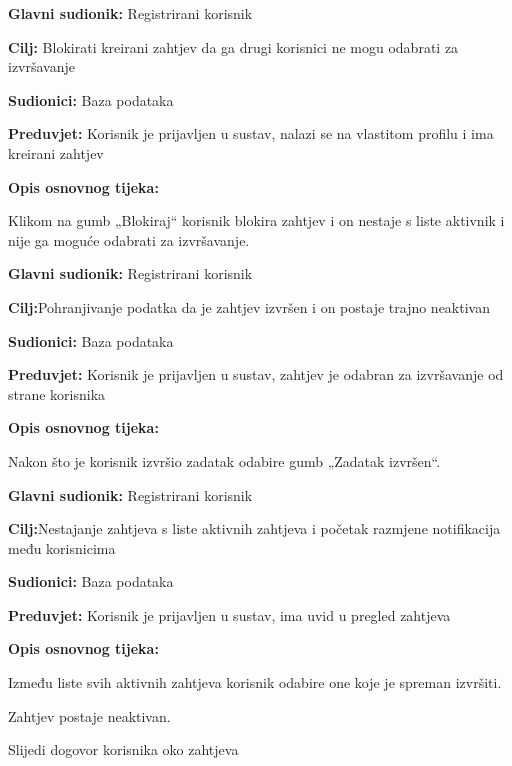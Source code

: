 \noindent {}
\begin{packed_item}
	\item \textbf{Glavni sudionik: }Registrirani korisnik
	\item  \textbf{Cilj:} Blokirati kreirani zahtjev da ga drugi korisnici ne mogu odabrati za izvršavanje
	\item  \textbf{Sudionici:} Baza podataka
	\item  \textbf{Preduvjet:} Korisnik je prijavljen u sustav, nalazi se na vlastitom profilu i ima kreirani zahtjev
	\item  \textbf{Opis osnovnog tijeka:}
	\item[] \begin{packed_enum}
		\item 	Klikom na gumb „Blokiraj“ korisnik blokira zahtjev i on nestaje s liste aktivnik i nije ga moguće odabrati za izvršavanje. 
	\end{packed_enum}
\end{packed_item}
\newpage
\noindent {}
\begin{packed_item}
	\item \textbf{Glavni sudionik: }Registrirani korisnik
	\item  \textbf{Cilj:}Pohranjivanje podatka da je zahtjev izvršen i on postaje trajno neaktivan
	\item  \textbf{Sudionici:} Baza podataka
	\item  \textbf{Preduvjet:} Korisnik je prijavljen u sustav, zahtjev je odabran za izvršavanje od strane korisnika
	\item  \textbf{Opis osnovnog tijeka:}
	\item[] \begin{packed_enum}
		\item 	Nakon što je korisnik izvršio zadatak odabire gumb „Zadatak izvršen“. 
	\end{packed_enum}
\end{packed_item}

\noindent {}
\begin{packed_item}
	\item \textbf{Glavni sudionik: }Registrirani korisnik
	\item  \textbf{Cilj:}Nestajanje zahtjeva s liste aktivnih zahtjeva i početak razmjene notifikacija među korisnicima 
	\item  \textbf{Sudionici:} Baza podataka
	\item  \textbf{Preduvjet:} Korisnik je prijavljen u sustav, ima uvid u pregled zahtjeva
	\item  \textbf{Opis osnovnog tijeka:}
	\item[] \begin{packed_enum}
		\item Između liste svih aktivnih zahtjeva korisnik odabire one koje je spreman izvršiti.
		\item Zahtjev postaje neaktivan.
		\item 	Slijedi dogovor korisnika oko zahtjeva
	\end{packed_enum}
\end{packed_item}

